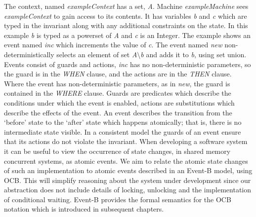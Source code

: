The context, named \emph{exampleContext} has a set, \emph{A}. Machine \emph{exampleMachine} sees \emph{exampleContext} to gain access to its contents. It has variables \emph{b} and \emph{c} which are typed in the invariant along with any additional constraints on the state. In this example \emph{b} is typed as a  powerset of \emph{A} and \emph{c} is an Integer. The example shows an event named \emph{inc} which increments the value of \emph{c}. The event named \emph{new} non-deterministically selects an element of set \emph{A$\setminus$b} and adds it to \emph{b}, using set union. Events consist of guards and actions, \emph{inc} has no non-deterministic parameters, so the guard is in the \emph{WHEN} clause, and the actions are in the \emph{THEN} clause. Where the event has non-deterministic parameters, as in \emph{new}, the guard is contained in the \emph{WHERE} clause. Guards are predicates which describe the conditions under which the event is enabled, actions are substitutions which describe the effects of the event. An event describes the transition from the `before' state to the `after' state which happens atomically; that is, there is no intermediate state visible. In a consistent model the guards of an event ensure that its actions do not violate the invariant. When developing a software system it can be useful to view the occurrence of state changes, in shared memory concurrent systems, as atomic events. We aim to relate the atomic state changes of such an implementation to atomic events described in an Event-B model, using OCB. This will simplify reasoning about the system under development since our abstraction does not include details of locking, unlocking and the implementation of conditional waiting. Event-B provides the formal semantics for the OCB notation which is introduced in subsequent chapters.

